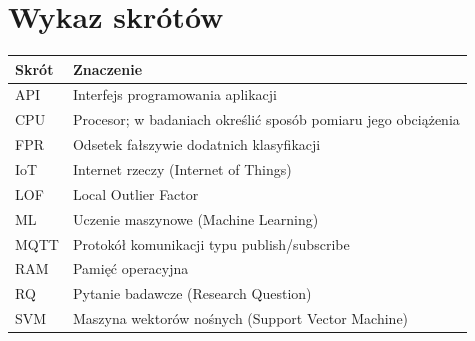 \chapter*{Wykaz skrótów}
\noindent\begin{tabularx}{\textwidth}{@{}lX@{}}
\toprule
Skrót & Znaczenie \\
\midrule
API & Interfejs programowania aplikacji \\
CPU & Procesor; w badaniach określić sposób pomiaru jego obciążenia \\
FPR & Odsetek fałszywie dodatnich klasyfikacji \\
IoT & Internet rzeczy (Internet of Things) \\
LOF & Local Outlier Factor \\
ML & Uczenie maszynowe (Machine Learning) \\
MQTT & Protokół komunikacji typu publish/subscribe \\
RAM & Pamięć operacyjna \\
RQ & Pytanie badawcze (Research Question) \\
SVM & Maszyna wektorów nośnych (Support Vector Machine) \\
\bottomrule
\end{tabularx}
